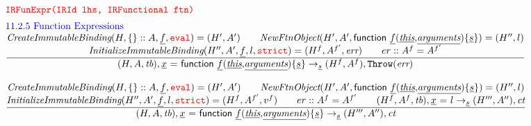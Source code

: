 \[
\begin{array}{l@{~~}l@{~~}ll}
\mtt{\normalsize\inred IRFunExpr(IRId lhs, IRFunctional ftn)}\\[.5em]
\mbox{\inblue 11.2.5 Function Expressions}\\
\frac{\begin{matrix}
\hf{CreateImmutableBinding}(H, \{\}::A, \ir{f}, \eval) = \resp
\rulesep
\hf{NewFtnObject}(H',A',\irfv) = (H'', l)
\\
\hf{InitializeImmutableBinding}(H'', A', \ir{f}, l, \strict) =   (H^f, A^{f'}, \err)%
\rulesep
er::A^f = A^{f'}
\end{matrix}}{\begin{matrix}
\state, \irfunexpr \rightarrow_{\ir\stmt} (H^f,A^f), \error
\end{matrix}}\\\\

\frac{\begin{matrix}
\hf{CreateImmutableBinding}(H, \{\}::A, \ir{f}, \eval) = \resp
\rulesep
\hf{NewFtnObject}(H',A',\irfv) = (H'', l)
\\
\hf{InitializeImmutableBinding}(H'', A', \ir{f}, l, \strict) = (H^f, A^{f'}, v^f)%
\rulesep
er::A^f = A^{f'}
\rulesep
(H^f,A^f,\tb), \irid \ {\tt =} \ l \rightarrow_{\ir\stmt} (H''',A''), \ct
\end{matrix}}{\begin{matrix}
\state, \irfunexpr \rightarrow_{\ir\stmt} (H''',A''), \ct
\end{matrix}}
\\[4em]



\end{array}
\]



